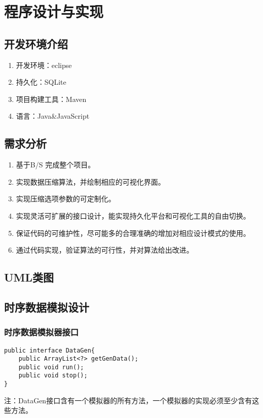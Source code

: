 
\chapter{程序设计与实现}
\label{Chapter 4}

\section{开发环境介绍}
\label{4.1}
\begin{enumerate}[(1)]
	\item 开发环境：eclipse
	\item 持久化：SQLite
	\item 项目构建工具：Maven
	\item 语言：Java\&JavaScript
\end{enumerate}

\section{需求分析}
\label{4.2}
\begin{enumerate}[(1)]
	\item 基于B/S 完成整个项目。
	\item 实现数据压缩算法，并绘制相应的可视化界面。
	\item 实现压缩选项参数的可定制化。
	\item 实现灵活可扩展的接口设计，能实现持久化平台和可视化工具的自由切换。
	\item 保证代码的可维护性，尽可能多的合理准确的增加对相应设计模式的使用。
	\item 通过代码实现，验证算法的可行性，并对算法给出改进。
\end{enumerate}

\section{UML类图}
\label{4.3}


\section{时序数据模拟设计}
\label{4.4}
\subsection{时序数据模拟器接口}
\begin{lstlisting}
public interface DataGen{
	public ArrayList<?> getGenData();
	public void run();
	public void stop();
}
\end{lstlisting}
注：DataGen接口含有一个模拟器的所有方法，一个模拟器的实现必须至少含有这些方法。

